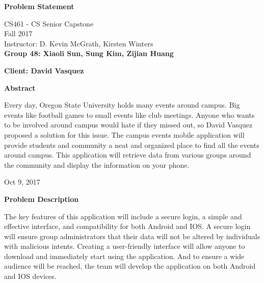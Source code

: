\documentclass[10pt,letterpaper]{article}
\begin{document}
\begin{titlepage}
\begin{center}
    \Huge
    \textbf{Problem Statement}
    
    \vspace{0.5in}
    \large
    CS461 - CS Senior Capstone\\
    
    \vspace{0.2in}
    \large
    Fall 2017\\
    
    \vspace{0.2in}
    \large
    Instructor: D. Kevin McGrath, Kirsten Winters\\
    
    \vspace{0.2in}
    \textbf{Group 48: Xiaoli Sun, Sung Kim, Zijian Huang}
    
    \vspace{0.2in}
    \textbf{Client: David Vasquez}
    
    \vspace{0.5in}
    \textbf{Abstract}\\
    \vspace{0.2in}
    
    Every day, Oregon State University holds many events around campus. Big events like football games to small events like club meetings. Anyone who wants to be involved around campus would hate if they missed out, so David Vasquez proposed a solution for this issue. The campus events mobile application will provide students and community a neat and organized place to find all the events around campus. This application will retrieve data from various groups around the community and display the information on your phone. 
    \vspace{0.3in}
    \vfill
    
    Oct 9, 2017

\end{center}
\end{titlepage}

\newpage

\begin{center}
\large
\textbf{Problem Description}
\end{center}

The key features of this application will include a secure login, a simple and effective interface, and compatibility for both Android and IOS. A secure login will ensure group administrators that their data will not be altered by individuals with malicious intents. Creating a user-friendly interface will allow anyone to download and immediately start using the application. And to ensure a wide audience will be reached, the team will develop the application on both Android and IOS devices. \\
\end{document}
